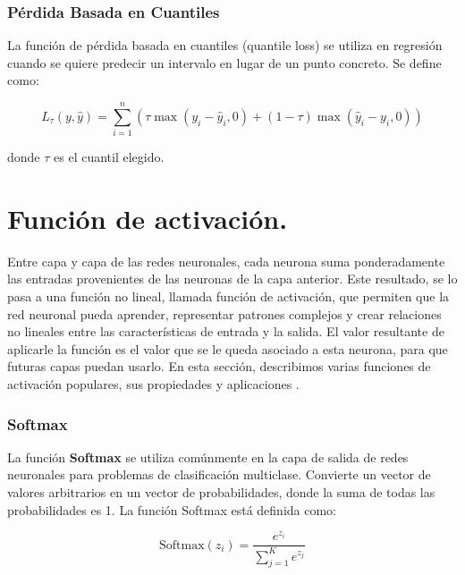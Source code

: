 \subsubsection{Pérdida Basada en Cuantiles}

La función de pérdida basada en cuantiles (quantile loss) se utiliza en regresión cuando se quiere predecir un intervalo en lugar de un punto concreto. Se define como:

\begin{equation}
    L_{\tau}(y, \hat{y}) = \sum_{i=1}^{n} \left(\tau \max(y_i - \hat{y}_i, 0) + (1 - \tau) \max(\hat{y}_i - y_i, 0)\right)
\end{equation}

donde \(\tau\) es el cuantil elegido.












\section{Función de activación.}

Entre capa y capa de las redes neuronales, cada neurona suma ponderadamente las entradas provenientes de las neuronas de la capa anterior. Este resultado, se lo pasa a una función no lineal, llamada función de activación, que permiten que la red neuronal pueda aprender, representar patrones complejos y crear relaciones no lineales entre las características de entrada y la salida. El valor resultante de aplicarle la función es el valor que se le queda asociado a esta neurona, para que futuras capas puedan usarlo. En esta sección, describimos varias funciones de activación populares, sus propiedades y aplicaciones \citep{pajares2021aprendizaje}.


\subsubsection*{Softmax}


La función \textbf{Softmax} se utiliza comúnmente en la capa de salida de redes neuronales para problemas de clasificación multiclase. Convierte un vector de valores arbitrarios en un vector de probabilidades, donde la suma de todas las probabilidades es 1. La función Softmax está definida como:

\begin{equation}
    \text{Softmax}(z_i) = \frac{e^{z_i}}{\sum_{j=1}^{K} e^{z_j}}
\end{equation}

